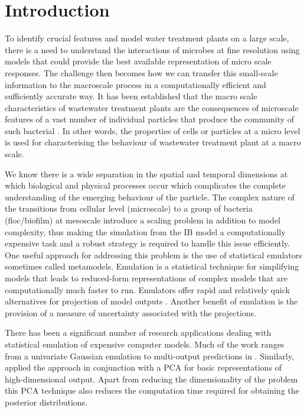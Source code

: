 \section{Introduction}
To identify crucial features and model water treatment plants on a large scale, there is a need to understand the interactions of microbes at fine resolution using models that could provide the best available representation of micro scale responses. The challenge then becomes how we can transfer this small-scale information to the macroscale process in a computationally efficient and sufficiently accurate way. It has been established that the macro scale characteristics of wastewater treatment plants are the consequences of microscale features of a vast number of individual particles that produce the community of such bacterial \citep{l11}. In other words, the properties of cells or particles at a micro level is used for characterising the behaviour of wastewater treatment plant at a macro scale. 

We know there is a wide separation in the spatial and temporal dimensions at which biological and physical processes occur which complicates the complete understanding of the emerging behaviour of the particle. The complex nature of the transitions from cellular level (microscale) to a group of bacteria (floc/biofilm) at mesoscale introduce a scaling problem in addition to model complexity, thus making the simulation from the IB model a computationally expensive task and a robust strategy is required to handle this issue efficiently. One useful approach for addressing this problem is the use of statistical emulators sometimes called metamodels. Emulation is a statistical technique for simplifying models that leads to reduced-form representations of complex models that are computationally much faster to run. Emulators offer rapid and relatively quick alternatives for projection of model outputs \citep{qwole}. Another benefit of emulation is the provision of a measure of uncertainty associated with the projections. 

There has been a significant number of research applications dealing with statistical emulation of expensive computer models. Much of the work ranges from a univariate Gaussian emulation to multi-output predictions in \citet{pd14}. Similarly, \cite{q23} applied the \cite{60} approach in conjunction with a PCA for basic representations of high-dimensional output. Apart from reducing the dimensionality of the problem this PCA technique also reduces the computation time required for obtaining the posterior distributions. 

